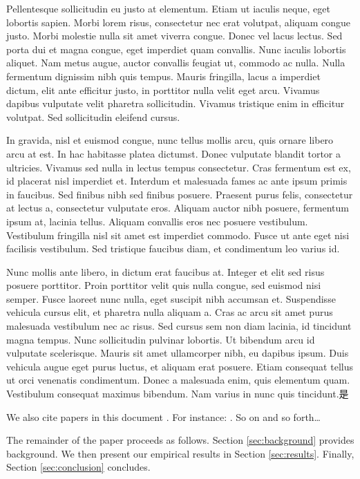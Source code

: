 \documentclass[12pt]{article}
\begin{document}
Pellentesque sollicitudin eu justo at elementum. Etiam ut iaculis neque, eget lobortis sapien. Morbi lorem risus, consectetur nec erat volutpat, aliquam congue justo. Morbi molestie nulla sit amet viverra congue. Donec vel lacus lectus. Sed porta dui et magna congue, eget imperdiet quam convallis. Nunc iaculis lobortis aliquet. Nam metus augue, auctor convallis feugiat ut, commodo ac nulla. Nulla fermentum dignissim nibh quis tempus. Mauris fringilla, lacus a imperdiet dictum, elit ante efficitur justo, in porttitor nulla velit eget arcu. Vivamus dapibus vulputate velit pharetra sollicitudin. Vivamus tristique enim in efficitur volutpat. Sed sollicitudin eleifend cursus.

In gravida, nisl et euismod congue, nunc tellus mollis arcu, quis ornare libero arcu at est. In hac habitasse platea dictumst. Donec vulputate blandit tortor a ultricies. Vivamus sed nulla in lectus tempus consectetur. Cras fermentum est ex, id placerat nisl imperdiet et. Interdum et malesuada fames ac ante ipsum primis in faucibus. Sed finibus nibh sed finibus posuere. Praesent purus felis, consectetur at lectus a, consectetur vulputate eros. Aliquam auctor nibh posuere, fermentum ipsum at, lacinia tellus. Aliquam convallis eros nec posuere vestibulum. Vestibulum fringilla nisl sit amet est imperdiet commodo. Fusce ut ante eget nisi facilisis vestibulum. Sed tristique faucibus diam, et condimentum leo varius id.

Nunc mollis ante libero, in dictum erat faucibus at. Integer et elit sed risus posuere porttitor. Proin porttitor velit quis nulla congue, sed euismod nisi semper. Fusce laoreet nunc nulla, eget suscipit nibh accumsan et. Suspendisse vehicula cursus elit, et pharetra nulla aliquam a. Cras ac arcu sit amet purus malesuada vestibulum nec ac risus. Sed cursus sem non diam lacinia, id tincidunt magna tempus. Nunc sollicitudin pulvinar lobortis. Ut bibendum arcu id vulputate scelerisque. Mauris sit amet ullamcorper nibh, eu dapibus ipsum. Duis vehicula augue eget purus luctus, et aliquam erat posuere. Etiam consequat tellus ut orci venenatis condimentum. Donec a malesuada enim, quis elementum quam. Vestibulum consequat maximus bibendum. Nam varius in nunc quis tincidunt.是

We also cite papers in this document \citep{Chetty2013}. For instance: \citet{Hansen1992}. So on and so forth\ldots

The remainder of the paper proceeds as follows. Section \ref{sec:background} provides background. We then present our
empirical results in Section \ref{sec:results}. Finally, Section \ref{sec:conclusion} concludes. 
\end{document}

